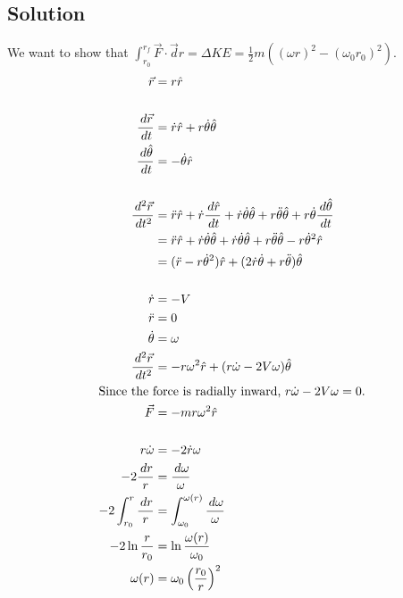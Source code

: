 \documentclass[solutions]{esg8012pset}
\renewcommand{\d}{\,d}
\begin{document}
\subsection{Solution}
  We want to show that $\displaystyle \int_{r_0}^{r_f}\vec F \cdot \vec d r = \Delta KE = \frac{1}{2}m\left((\omega r)^2 - (\omega_0 r_0)^2\right)$.
  \begin{align*}
  \vec r & = r \hat r \\
  \\
  \frac{\d \vec r}{\d t} & = \dot r\hat r + r\dot\theta\hat\theta \\
  \frac{\d \hat \theta}{\d t} & = -\dot\theta\hat r \\
  \\
  \frac{\d^2 \vec r}{\d t^2} & = \ddot r\hat r + \dot r\frac{\d \hat r}{\d t} + \dot r\dot\theta\hat\theta + r\ddot\theta\hat\theta + r\dot\theta\frac{\d \hat\theta}{\d t} \\
    & = \ddot r\hat r + \dot r\dot\theta\hat\theta + \dot r\dot\theta\hat\theta + r\ddot\theta\hat\theta - r\dot\theta^2\hat r \\
    & = (\ddot r - r\dot\theta^2)\hat r + (2\dot r\dot\theta + r\ddot\theta)\hat\theta \\
  \\
  \dot r & = -V \\
  \ddot r & = 0 \\
  \dot\theta & = \omega \\
  \frac{\d^2 \vec r}{\d t^2} & = -r\omega^2\hat r + (r\dot\omega - 2V\omega)\hat\theta \\
  \intertext{Since the force is radially inward, $r\dot\omega - 2V\omega = 0$.}
  \vec F & = -mr\omega^2\hat r \\
  \\
  r\dot\omega & = -2\dot r\omega \\
  -2\frac{\d r}{r} & = \frac{\d \omega}{\omega} \\
  -2\int_{r_0}^{r}\frac{\d r}{r} & = \int_{\omega_0}^{\omega(r)}\frac{\d \omega}{\omega} \\
  -2\ln\frac{r}{r_0} & = \ln\frac{\omega(r)}{\omega_0} \\
  \omega(r) & = \omega_0 \left(\frac{r_0}{r}\right)^2\\

\end{align*}
\end{document}
